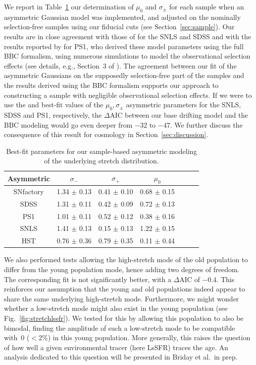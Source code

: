 \documentclass[]{aa}
\begin{document}
We report in Table~\ref{tab:bbc} our determination of $\mu_0$ and $\sigma_{\pm}$
for each sample when an asymmetric Gaussian model was implemented, and adjusted
on the nominally selection-free samples using our fiducial cuts (see
Section~\ref{sec:sample}). Our results are in close agreement with those of
\cite{scolnic2016} for the SNLS and SDSS and with the results reported by
\cite{scolnic2018a} for PS1, who derived these model parameters using the full
BBC formalism, using numerous simulations to model the observational selection
effects (see details, e.g., Section~3 of \citealt{kessler2017}). The agreement
between our fit of the asymmetric Gaussians on the supposedly selection-free
part of the samples and the results derived using the BBC formalism supports our
approach to constructing a sample with negligible observational selection
effects. If we were to use the \cite{scolnic2016} and \cite{scolnic2018a}
best-fit values of the $\mu_0, \sigma_{\pm}$ asymmetric parameters for the SNLS,
SDSS and PS1, respectively, the $\Delta$AIC between our base drifting model and
the BBC modeling would go even deeper from $-32$ to $-47$. We further discuss
the consequence of this result for cosmology in Section~\ref{sec:discussion}.
    
\begin{table}
    \centering
    \caption{Best-fit parameters for our sample-based asymmetric modeling of the
    underlying stretch distribution.}
    \label{tab:bbc}
    \begin{tabular}{ccccccc}
    \hline\hline
    Asymmetric & $\sigma_{-}$ & $\sigma_{+}$ & $\mu_0$ \\
    \hline
    SNfactory & 1.34 $\pm$ 0.13 & 0.41 $\pm$ 0.10 & 0.68 $\pm$ 0.15 \\
    SDSS & 1.31 $\pm$ 0.11 & 0.42 $\pm$ 0.09 & 0.72 $\pm$ 0.13 \\
    PS1 & 1.01 $\pm$ 0.11 & 0.52 $\pm$ 0.12 & 0.38 $\pm$ 0.16 \\
    SNLS & 1.41 $\pm$ 0.13 & 0.15 $\pm$ 0.13 & 1.22 $\pm$ 0.15 \\
    HST & 0.76 $\pm$ 0.36 & 0.79 $\pm$ 0.35 & 0.11 $\pm$ 0.44 \\
    \hline
    \end{tabular}
\end{table}
    
We also performed tests allowing the high-stretch mode of the old population to
differ from the young population mode, hence adding two degrees of freedom. The
corresponding fit is not significantly better, with a $\Delta$AIC of $-0.4$.
This reinforces our assumption that the young and old populations indeed appear
to share the same underlying high-stretch mode. Furthermore, we might wonder
whether a low-stretch mode might also exist in the young population (see
Fig.~\ref{fig:stretchlssfr}). We tested for this by allowing this population to
also be bimodal, finding the amplitude of such a low-stretch mode to be
compatible with~0 ($<2\%$) in this young population. More generally, this raises
the question of how well a given environmental tracer (here LsSFR) traces the
age. An analysis dedicated to this question will be presented in Briday et al.\
in prep.
\end{document}
